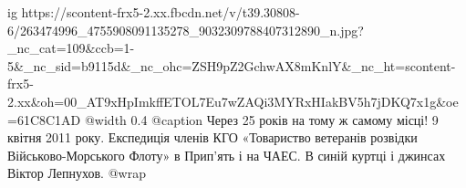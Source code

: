  
 
 
 
 

\ifcmt
  ig https://scontent-frx5-2.xx.fbcdn.net/v/t39.30808-6/263474996_4755908091135278_9032309788407312890_n.jpg?_nc_cat=109&ccb=1-5&_nc_sid=b9115d&_nc_ohc=ZSH9pZ2GchwAX8mKnlY&_nc_ht=scontent-frx5-2.xx&oh=00_AT9xHpImkffETOL7Eu7wZAQi3MYRxHIakBV5h7jDKQ7x1g&oe=61C8C1AD
  @width 0.4
	@caption Через 25 років на тому ж самому місці! 9 квітня 2011 року. Експедиція членів КГО «Товариство ветеранів розвідки Військово-Морського Флоту» в Прип’ять і на ЧАЕС. В синій куртці і джинсах Віктор Лепнухов.
  @wrap 
\fi
